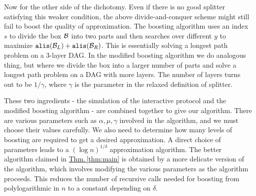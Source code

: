 \documentclass{acmsmall}
\newcommand{\cB}{{\cal B}}
\newcommand{\Thm}[1]{\hyperref[thm:#1]{Thm.\,\ref*{thm:#1}}} %
\newcommand{\alis}{{\tt alis}}
\newcommand{\gridprec}{\alpha}
\begin{document}
Now for the other side of the dichotomy. Even if there is no good splitter
satisfying this weaker condition, the above divide-and-conquer
scheme might still fail to boost the quality of approximation.
The  boosting algorithm uses an index $s$ 
to divide the box $\cB$ into two parts and then searches over different $y$ to maximize
$\alis(\cB_L)+\alis(\cB_R)$.  This is essentially solving a longest path problem on
a 3-layer DAG.  In the modified boosting algorithm we do analogous thing,
but where we divide the box
into a larger number of parts and solve a longest path problem on a DAG with more layers.
The number of layers turns out to be $1/\gamma$, where $\gamma$ is
the parameter in the relaxed definition of splitter.

These two ingredients - the simulation of the interactive protocol
and the modified boosting algorithm - are combined together
to give our algorithm.  There are various parameters such as $\gridprec,\mu,\gamma$ involved
in the algorithm, and we must choose their values carefully. We also need to determine how many
levels of boosting are required to get a desired approximation.
A direct
choice of parameters leads to a $(\log n)^{1/\delta}$
approximation algorithm.  
The better algorithm
claimed in \Thm{main} is obtained by a more delicate
version of the algorithm, which involves modifying the various parameters
as the algorithm proceeds.  This reduces
the number of recursive calls needed for boosting
from polylogarithmic in $n$ to a constant depending on $\delta$.
%
%
\end{document}
